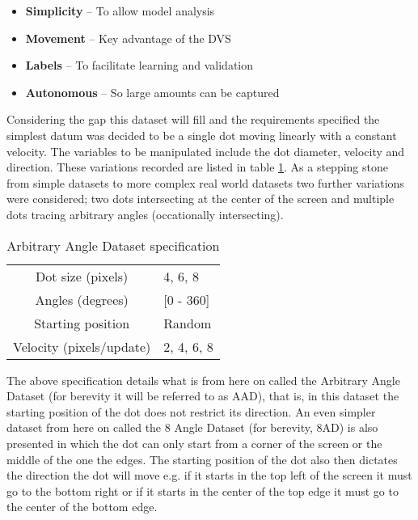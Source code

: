 \begin{itemize}
    \itemsep-0.5em
    \item \textbf{Simplicity} -- To allow model analysis 
    \item \textbf{Movement} -- Key advantage of the DVS
    \item \textbf{Labels} -- To facilitate learning and validation
    \item \textbf{Autonomous} -- So large amounts can be captured
\end{itemize}

Considering the gap this dataset will fill and the requirements specified the simplest datum was decided to be a single dot moving linearly with a constant velocity. 
The variables to be manipulated include the dot diameter, velocity and direction. 
These variations recorded are listed in table \ref{tb:datasetspecs}.
As a stepping stone from simple datasets to more complex real world datasets two further variations were considered; two dots intersecting at the center of the screen and multiple dots tracing arbitrary angles (occationally intersecting).  

\begin{table}[h]
\centering
\begin{tabular}{ | c | l | }
    \hline
    Dot size (pixels) & 4, 6, 8 \\
    Angles (degrees) & [0 - 360] \\
    Starting position & Random \\
    Velocity (pixels/update) & 2, 4, 6, 8 \\
    \hline
\end{tabular}
\caption{Arbitrary Angle Dataset specification}
\label{tb:datasetspecs}
\end{table}

The above specification details what is from here on called the Arbitrary Angle Dataset (for berevity it will be referred to as AAD), that is, in this dataset the starting position of the dot does not restrict its direction.
An even simpler dataset from here on called the 8 Angle Dataset (for berevity, 8AD) is also presented in which the dot can only start from a corner of the screen or the middle of the one the edges.
The starting position of the dot also then dictates the direction the dot will move e.g. if it starts in the top left of the screen it must go to the bottom right or if it starts in the center of the top edge it must go to the center of the bottom edge.


